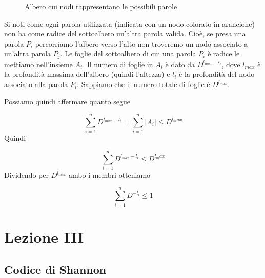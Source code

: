 \documentclass[12pt]{report}
\begin{document}
\begin{dimo}
\begin{figure}
\begin{center}
{{
                    }
                }
            \end{center}
            \caption{Albero cui nodi rappresentano le possibili parole}
        \end{figure}
    \end{dimo}

    \noindent
    Si noti come ogni parola utilizzata (indicata con un nodo colorato in arancione) \underline{non} ha come radice del sottoalbero un'altra parola valida. Cioè, se presa una parola $P_i$ percorriamo l'albero verso l'alto non troveremo un nodo associato a un'altra parola $P_j$.
    Le foglie del sottoalbero di cui una parola $P_i$ è radice le mettiamo nell'insieme $A_i$. Il numero di foglie in $A_i$ è dato da $D^{l_{max} - l_i}$, dove $l_{max}$ è la profondità massima dell'albero (quindi l'altezza) e $l_i$ è la profondità del nodo associato alla parola $P_i$. Sappiamo che il numero totale di foglie è $D^{l_{max}}$.

    Possiamo quindi affermare quanto segue

    $$\sum_{i = 1}^n D^{l_{max} - l_i} = \sum_{i = 1}^n |A_i| \leq D^{l_max}$$
    Quindi

    $$\sum_{i = 1}^n D^{l_{max} - l_i}\leq D^{l_max}$$
    Dividendo per $D^{l_{max}}$ ambo i membri otteniamo

    $$\sum_{i = 1}^n D^{-l_i} \leq 1$$

    \chapter{Lezione III}
    \label{cap:Lezione III}

    \section{Codice di Shannon}
\end{document}
